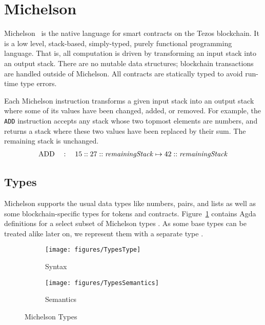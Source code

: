 \section{Michelson}
\label{sec:michelson}
\label{sec:Mtype}


Michelson~\cite{michelson,devres} is the native language for smart contracts on the Tezos blockchain.
It is a low level, stack-based, simply-typed, purely functional programming
language. That is, all computation is driven by transforming an input
stack into an output stack. There are no mutable data structures;
blockchain transactions are handled outside of Michelson.
All contracts are statically typed to avoid run-time type errors.

Each Michelson instruction transforms a given input stack into an output stack
where some of its values have been changed, added, or removed.
For example, the \verb=ADD= instruction accepts any stack
whose two topmost elements are numbers,
and returns a stack where these two values have been replaced by their sum. The remaining stack is unchanged.
\begin{align*}
	\text{ADD} \quad:\quad 15 :: 27 :: \text{\emph{remainingStack}}
	\mapsto	           42 :: \text{\emph{remainingStack}}
\label{equ:ADD}
\end{align*}

\subsection{Types}
\label{sec:michelson-types}

Michelson supports the usual data types like numbers, pairs, and lists as well as
some blockchain-specific types for tokens and contracts. 
Figure~\ref{fig:Type} contains Agda definitions for a select subset of
Michelson types {\AType}. As some base types can be treated alike later on, we
represent them with a separate type {\ABaseType}.

\begin{figure}[tp]
  \begin{subfigure}{0.48\textwidth}
    \noindent
    \texttt{[image: figures/TypesType]}
    \caption{Syntax}
    \label{fig:Type}
  \end{subfigure}
  \begin{subfigure}{0.48\textwidth}
  \texttt{[image: figures/TypesSemantics]}
  \caption{Semantics}
  \label{fig:Type-Semantics}
\end{subfigure}
\caption{Michelson Types}
\label{Type}
\end{figure}

